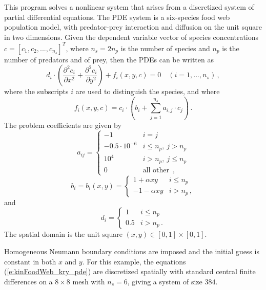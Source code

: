 This program solves a nonlinear system that arises from a discretized system of partial
differential equations. The PDE system is a six-species food web population
model, with predator-prey interaction and diffusion on the unit square in
two dimensions. Given the dependent variable vector of species concentrations
$c = [c_1, c_2,..., c_{n_s}]^T$, where $n_s = 2 n_p$ is the number of species 
and $n_p$ is the number of predators and of prey, then
the PDEs can be written as
\begin{equation}\label{e:kinFoodWeb_kry_pde}
  d_i \cdot \left( \frac{\partial^2 c_i}{\partial x^2} + 
    \frac{\partial^2 c_i}{\partial y^2} \right) + f_i(x,y,c) = 0
  \quad (i=1,...,n_s) \, ,
\end{equation}
where the subscripts $i$ are used to distinguish the species, and where
\begin{equation}\label{e:kinFoodWeb_kry_fterm}
f_i(x,y,c) = c_i \cdot \left(b_i + \sum_{j=1}^{n_s} a_{i,j} \cdot c_j \right) \, .
\end{equation}
The problem coefficients are given by
\begin{equation*}
  a_{ij} = 
  \begin{cases}
    -1                 & i=j \\
    -0.5 \cdot 10^{-6} & i \leq n_p , ~ j > n_p  \\
    10^4               & i > n_p , ~ j \leq n_p  \\
    0                  & \mbox{all other } \, ,
  \end{cases}
\end{equation*}
\begin{equation*}
  b_i = b_i(x,y) = 
  \begin{cases}
    1 + \alpha xy   & i \leq n_p  \\
    -1 - \alpha xy   & i > n_p \, ,
  \end{cases}
\end{equation*}
and
\begin{equation*}
  d_i = 
  \begin{cases}
    1 & i \leq n_p  \\
    0.5 & i > n_p  \, .
  \end{cases}
\end{equation*}
The spatial domain is the unit square $(x,y) \in [0,1] \times [0,1]$.

Homogeneous Neumann boundary conditions are imposed and the initial
guess is constant in both $x$ and $y$. For this example, the equations
(\ref{e:kinFoodWeb_kry_pde}) are discretized spatially with standard central finite
differences on a $8 \times 8$ mesh with $n_s = 6$, giving a system of size $384$.

